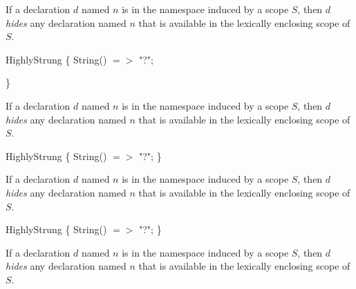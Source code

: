 \documentclass{article}
\begin{document}
\LMHash{}
If a  declaration $d$ named $n$ is in the namespace induced by a scope $S$, then $d$ {\em hides} any declaration named $n$ that is available in the lexically enclosing scope of $S$.


\begin{dartCode}

\CLASS{} 			HighlyStrung \{
String() $=>$ "?";


\}
\end{dartCode}

\LMHash{}
If a  declaration $d$ named $n$ is in the namespace induced by a scope $S$, then $d$ {\em hides} any declaration named $n$ that is available in the lexically enclosing scope of $S$.


\begin{dartCode}
\CLASS{} HighlyStrung \{
  String() $=>$ "?";%
\} %
\end{dartCode}

\LMHash{}
If a  declaration $d$ named $n$ is in the namespace induced by a scope $S$, then $d$ {\em hides} any declaration named $n$ that is available in the lexically enclosing scope of $S$.

\begin{dartCode}
\CLASS{} HighlyStrung \{
  String() $=>$ "?";
\}
\end{dartCode}

\LMHash{}
If a  declaration $d$ named $n$ is in the namespace induced by a scope $S$, then $d$ {\em hides} any declaration named $n$ that is available in the lexically enclosing scope of $S$.

\end{document}
